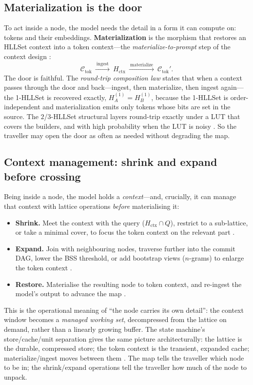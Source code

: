 \documentclass[11pt,a4paper]{article}
\theoremstyle{remark}
\newcommand{\HLL}{\ensuremath{H}}                      %
\newcommand{\Ctx}{\ensuremath{\mathcal{C}}}             %
\begin{document}
\subsection{Materialization is the door}

To act inside a node, the model needs the detail in a form it can compute on:
tokens and their embeddings. \textbf{Materialization} is the morphism that
restores an HLLSet context into a token context---the
\emph{materialize-to-prompt} step of the context design \cite{ctx2026}:
\begin{equation}
\label{eq:door}
\Ctx_{\mathrm{tok}}
\ \xrightarrow{\ \mathrm{ingest}\ }\ \HLL_{\mathrm{ctx}}
\ \xrightarrow{\ \mathrm{materialize}\ }\ \Ctx_{\mathrm{tok}}' .
\end{equation}
The door is faithful. The \emph{round-trip composition law} states that when a
context passes through the door and back---ingest, then materialize, then ingest
again---the 1-HLLSet is recovered exactly,
$\HLL_A^{(1)}=\HLL_B^{(1)}$, because the 1-HLLSet is order-independent and
materialization emits only tokens whose bits are set in the source. The
$2$/$3$-HLLSet structural layers round-trip exactly under a LUT that covers the
builders, and with high probability when the LUT is noisy \cite{ctx2026}. So
the traveller may open the door as often as needed without degrading the map.

\subsection{Context management: shrink and expand before crossing}

Being inside a node, the model holds a \emph{context}---and, crucially, it can
manage that context with lattice operations \emph{before} materialising it:
\begin{itemize}[leftmargin=*,nosep]
  \item \textbf{Shrink.} Meet the context with the query
    ($\HLL_{\mathrm{ctx}}\cap Q$), restrict to a sub-lattice, or take a minimal
    cover, to focus the token context on the relevant part
    \cite{ctx2026,state2026}.
  \item \textbf{Expand.} Join with neighbouring nodes, traverse further into the
    commit DAG, lower the BSS threshold, or add bootstrap views ($n$-grams) to
    enlarge the token context \cite{ewm2026,companion2026}.
  \item \textbf{Restore.} Materialise the resulting node to token context, and
    re-ingest the model's output to advance the map \cite{ctx2026}.
\end{itemize}
This is the operational meaning of ``the node carries its own detail'': the
context window becomes a \emph{managed working set}, decompressed from the
lattice on demand, rather than a linearly growing buffer. The state machine's
store/cache/unit separation gives the same picture architecturally: the lattice
is the durable, compressed store; the token context is the transient, expanded
cache; materialize/ingest moves between them \cite{state2026}. The map tells the
traveller which node to be in; the shrink/expand operations tell the traveller
how much of the node to unpack.
\end{document}
